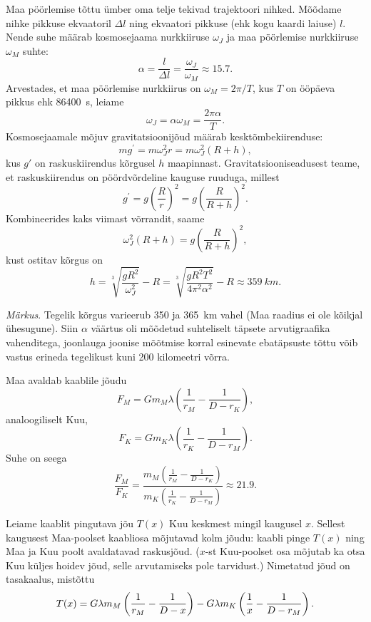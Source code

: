 \documentclass[10pt]{article}
\begin{document}
{
\solu
Maa pöörlemise tõttu ümber oma telje tekivad trajektoori nihked. Mõõdame nihke pikkuse ekvaatoril $\Delta l$ ning ekvaatori pikkuse (ehk kogu kaardi laiuse) $l$. Nende suhe määrab kosmosejaama nurkkiiruse $\omega_J$ ja maa pöörlemise nurkkiiruse $\omega_M$ suhte:
\[
\alpha=\frac{l}{\Delta l}=\frac{\omega_{J}}{\omega_{M}} \approx \num{15,7}.
\]
Arvestades, et maa pöörlemise nurkkiirus on $\omega_M = 2\pi /T$, kus $T$ on ööpäeva pikkus ehk \SI{86400}{s}, leiame
\[
\omega_J = \alpha \omega_M = \frac{2\pi\alpha}{T}.
\]
Kosmosejaamale mõjuv gravitatsioonijõud määrab kesktõmbekiirenduse:
\[
m g^{\prime}= m\omega_J^2 r = m \omega_{J}^{2}(R+h),
\]
kus $g'$ on raskuskiirendus kõrgusel $h$ maapinnast. Gravitatsiooniseadusest teame, et raskuskiirendus on pöördvõrdeline kauguse ruuduga, millest
\[
g^{\prime}= g\left(\frac{R}{r}\right)^2 = g\left(\frac{R}{R+h}\right)^{2}.
\]
Kombineerides kaks viimast võrrandit, saame
\[
\omega_{J}^{2}(R+h)=g\left(\frac{R}{R+h}\right)^{2},
\]
kust ostitav kõrgus on
\[
h=\sqrt[3]{\frac{g R^{2}}{\omega_{J}^{2}}}-R=\sqrt[3]{\frac{g R^{2} T^{2}}{4 \pi^{2} \alpha^{2}}}-R \approx \SI{359}{km}.
\]

\emph{Märkus}. Tegelik kõrgus varieerub \num{350} ja \SI{365}{km} vahel (Maa raadius ei ole kõikjal ühesugune). Siin $\alpha$ väärtus oli mõõdetud suhteliselt täpsete arvutigraafika vahenditega, joonlauga joonise mõõtmise korral esinevate ebatäpsuste tõttu võib vastus erineda tegelikust kuni \num{200} kilomeetri võrra.
\probend
\bigskip


\solu
\osa
Maa avaldab kaablile jõudu
\[ 
F_M = G m_M \lambda \left( \frac{1}{r_M} - \frac{1}{D - r_K} \right),
\]
analoogiliselt Kuu,
\[ 
F_K = G m_K \lambda \left( \frac{1}{r_K} - \frac{1}{D - r_M} \right).
\]
Suhe on seega
\[ \frac{F_M}{F_K} = \frac{ m_M \left( \frac{1}{r_M} - \frac{1}{D -
		r_K} \right) }{ m_K \left( \frac{1}{r_K} - \frac{1}{D - r_M} \right) } \approx
\num{21,9}.\]

\osa
Leiame kaablit pingutava jõu $T(x)$ Kuu keskmest mingil kaugusel $x$. Sellest
kaugusest Maa-poolset kaabliosa mõjutavad kolm jõudu: kaabli pinge $T(x)$ ning
Maa ja Kuu poolt avaldatavad raskusjõud. ($x$-st Kuu-poolset osa mõjutab ka
otsa Kuu küljes hoidev jõud, selle arvutamiseks pole tarvidust.) Nimetatud jõud on
tasakaalus, mistõttu
\[ 
T(x) = G\lambda m_M \left( \frac{1}{r_M} - \frac{1}{D-x} \right) -
G\lambda m_K \left( \frac{1}{x} - \frac{1}{D-r_M} \right) \text. 
\]

}
\end{document}

